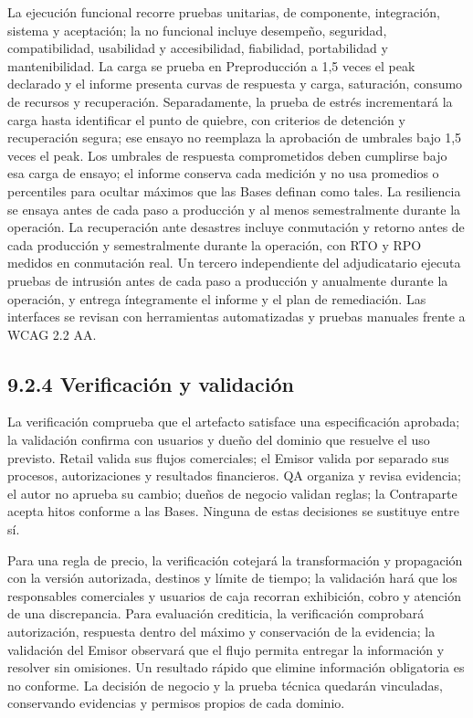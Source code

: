 \documentclass[11pt]{article}
\begin{document}
La ejecución funcional recorre pruebas unitarias, de componente, integración, sistema y aceptación; la no funcional incluye desempeño, seguridad, compatibilidad, usabilidad y accesibilidad, fiabilidad, portabilidad y mantenibilidad. La carga se prueba en Preproducción a 1,5 veces el peak declarado y el informe presenta curvas de respuesta y carga, saturación, consumo de recursos y recuperación. Separadamente, la prueba de estrés incrementará la carga hasta identificar el punto de quiebre, con criterios de detención y recuperación segura; ese ensayo no reemplaza la aprobación de umbrales bajo 1,5 veces el peak. Los umbrales de respuesta comprometidos deben cumplirse bajo esa carga de ensayo; el informe conserva cada medición y no usa promedios o percentiles para ocultar máximos que las Bases definan como tales. La resiliencia se ensaya antes de cada paso a producción y al menos semestralmente durante la operación. La recuperación ante desastres incluye conmutación y retorno antes de cada producción y semestralmente durante la operación, con RTO y RPO medidos en conmutación real. Un tercero independiente del adjudicatario ejecuta pruebas de intrusión antes de cada paso a producción y anualmente durante la operación, y entrega íntegramente el informe y el plan de remediación. Las interfaces se revisan con herramientas automatizadas y pruebas manuales frente a WCAG 2.2 AA.

\subsection{9.2.4 Verificación y validación}



La verificación comprueba que el artefacto satisface una especificación aprobada; la validación confirma con usuarios y dueño del dominio que resuelve el uso previsto. Retail valida sus flujos comerciales; el Emisor valida por separado sus procesos, autorizaciones y resultados financieros. QA organiza y revisa evidencia; el autor no aprueba su cambio; dueños de negocio validan reglas; la Contraparte acepta hitos conforme a las Bases. Ninguna de estas decisiones se sustituye entre sí.

Para una regla de precio, la verificación cotejará la transformación y propagación con la versión autorizada, destinos y límite de tiempo; la validación hará que los responsables comerciales y usuarios de caja recorran exhibición, cobro y atención de una discrepancia. Para evaluación crediticia, la verificación comprobará autorización, respuesta dentro del máximo y conservación de la evidencia; la validación del Emisor observará que el flujo permita entregar la información y resolver sin omisiones. Un resultado rápido que elimine información obligatoria es no conforme. La decisión de negocio y la prueba técnica quedarán vinculadas, conservando evidencias y permisos propios de cada dominio.
\end{document}
